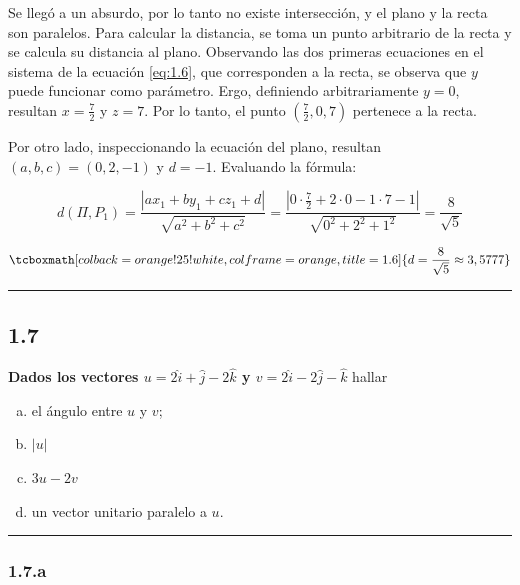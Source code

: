 \documentclass{article}
\begin{document}
Se llegó a un absurdo, por lo tanto no existe intersección, y el plano y la recta son paralelos. Para calcular la distancia, se toma un punto arbitrario de la recta y se calcula su distancia al plano. Observando las dos primeras ecuaciones en el sistema de la ecuación \ref{eq:1.6}, que corresponden a la recta, se observa que $y$ puede funcionar como parámetro. Ergo, definiendo arbitrariamente $y = 0$, resultan $x=\frac{7}{2}$ y $z=7$. Por lo tanto, el punto $(\frac{7}{2}, 0, 7)$ pertenece a la recta.

Por otro lado, inspeccionando la ecuación del plano, resultan $(a, b, c) = (0, 2, -1)$ y $d = -1$. Evaluando la fórmula:

\begin{equation}
d(\Pi, P_1) = \frac{|a x_1 + b y_1 + c z_1 + d|}{\sqrt{a^2 + b^2 + c^2}} = \frac{|0 \cdot \frac{7}{2} + 2 \cdot 0 -1 \cdot 7 - 1 |}{\sqrt{0^2 + 2^2 + 1^2}} = \frac{8}{\sqrt{5}}
\end{equation}

\begin{equation}
\tcboxmath[colback=orange!25!white,colframe=orange,title=1.6]
{ d = \frac{8}{\sqrt{5}} \approx 3,5777 }
\end{equation}

\hrule
\vspace{10 pt}

\subsection*{1.7}
\label{subsec:1.7}

\textbf{Dados los vectores $u = 2 \hat{i} + \hat{j} -2\hat{k}$ y $v = 2\hat{i} - 2\hat{j}-\hat{k}$} hallar 

\begin{enumerate}[(a)]
\bfseries
\item el ángulo entre $u$ y $v$;

\item $|u|$

\item $3u - 2v$

\item un vector unitario paralelo a $u$.
\end{enumerate}
\hrule

\subsubsection*{1.7.a}
\label{subsubsec:1.7.a}
\end{document}
